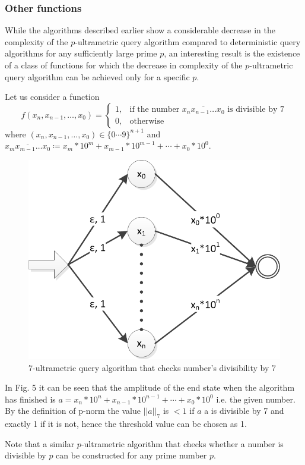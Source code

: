 \documentclass{llncs}
\begin{document}
\subsubsection{Other functions}
While the algorithms described earlier show a considerable decrease in the complexity of the $p$-ultrametric query algorithm compared to deterministic query algorithms for any sufficiently large prime $p$, an interesting result is the existence of a class of functions for which the decrease in complexity of the $p$-ultrametric query algorithm can be achieved only for a specific $p$.

Let us consider a function
$$
f(x_n,x_{n-1},\dots,x_0)=\begin{cases}
1, & \text{if the number } \overline{x_nx_{n-1}\dots x_0} \text{ is divisible by 7} \\
0, & \text{otherwise}
\end{cases}
$$
where $(x_n,x_{n-1},\dots,x_0) \in \{0 \cdots 9\}^{n+1}$ and $\overline{x_mx_{m-1}\dots x_0} \coloneqq x_m*10^m+x_{m-1}*10^{m-1}+\cdots+x_0*10^0$.
\begin{figure}
	\centering
	\includegraphics{divisibility.png}
	\caption{$7$-ultrametric query algorithm that checks number's divisibility by 7}
	  \label{div}
\end{figure}

In Fig. 5 it can be seen that the amplitude of the end state when the algorithm has finished is $a=x_n*10^n+x_{n-1}*10^{n-1}+\cdots+x_0*10^0$ i.e. the given number. By the definition of p-norm the value $||a||_7$ is $<1$ if $a$ a is divisible by 7 and exactly 1 if it is not, hence the threshold value can be chosen as 1.

Note that a similar $p$-ultrametric algorithm that checks whether a number is divisible by $p$ can be constructed for any prime number $p$.
%




\end{document}
